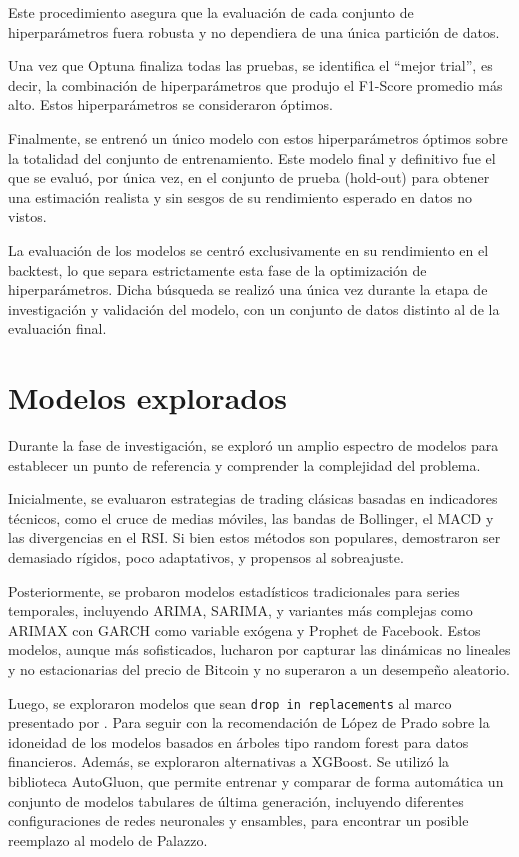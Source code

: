 Este procedimiento asegura que la evaluación de cada conjunto de hiperparámetros fuera robusta y no dependiera de una única partición de datos.

Una vez que Optuna finaliza todas las pruebas, se identifica el ``mejor trial'', es decir, la combinación de hiperparámetros que produjo el F1-Score promedio más alto. Estos hiperparámetros se consideraron óptimos.

Finalmente, se entrenó un único modelo con estos hiperparámetros óptimos sobre la totalidad del conjunto de entrenamiento. Este modelo final y definitivo fue el que se evaluó, por única vez, en el conjunto de prueba (hold-out) para obtener una estimación realista y sin sesgos de su rendimiento esperado en datos no vistos.

La evaluación de los modelos se centró exclusivamente en su rendimiento en el backtest, lo que separa estrictamente esta fase de la optimización de hiperparámetros. Dicha búsqueda se realizó una única vez durante la etapa de investigación y validación del modelo, con un conjunto de datos distinto al de la evaluación final.


\section{Modelos explorados}

Durante la fase de investigación, se exploró un amplio espectro de modelos para establecer un punto de referencia y comprender la complejidad del problema.

Inicialmente, se evaluaron estrategias de trading clásicas basadas en indicadores técnicos, como el cruce de medias móviles, las bandas de Bollinger, el MACD y las divergencias en el RSI. Si bien estos métodos son populares, demostraron ser demasiado rígidos, poco adaptativos, y propensos al sobreajuste.

Posteriormente, se probaron modelos estadísticos tradicionales para series temporales, incluyendo ARIMA, SARIMA, y variantes más complejas como ARIMAX con GARCH \cite{tsay2010} como variable exógena y Prophet de Facebook. Estos modelos, aunque más sofisticados, lucharon por capturar las dinámicas no lineales y no estacionarias del precio de Bitcoin y no superaron a un desempeño aleatorio.

Luego, se exploraron modelos que sean \texttt{drop in replacements} al marco presentado por \cite{Palazzo:2023}. Para seguir con la recomendación de López de Prado sobre la idoneidad de los modelos basados en árboles tipo random forest para datos financieros. Además, se exploraron alternativas a XGBoost. Se utilizó la biblioteca AutoGluon, que permite entrenar y comparar de forma automática un conjunto de modelos tabulares de última generación, incluyendo diferentes configuraciones de redes neuronales y ensambles, para encontrar un posible reemplazo al modelo de Palazzo.

